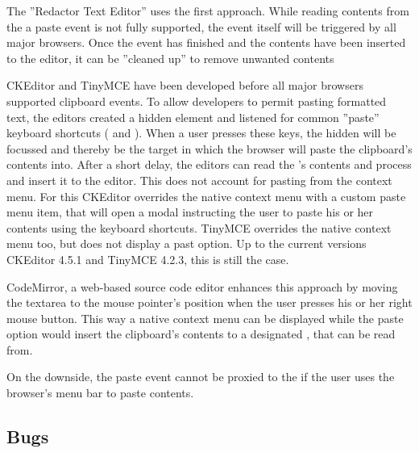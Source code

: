 The ''Redactor Text Editor'' uses the first approach. While reading contents from the a paste event is not fully supported, the event itself will be triggered by all major browsers. Once the event has finished and the contents have been inserted to the editor, it can be ''cleaned up'' to remove unwanted contents

CKEditor and TinyMCE have been developed before all major browsers supported clipboard events. To allow developers to permit pasting formatted text, the editors created a hidden  element and listened for common ''paste'' keyboard shortcuts ( and ). When a user presses these keys, the hidden  will be focussed and thereby be the target in which the browser will paste the clipboard's contents into. After a short delay, the editors can read the 's contents and process and insert it to the editor. This does not account for pasting from the context menu. For this CKEditor overrides the native context menu with a custom paste menu item, that will open a modal instructing the user to paste his or her contents using the keyboard shortcuts. TinyMCE overrides the native context menu too, but does not display a past option. Up to the current versions CKEditor 4.5.1 and TinyMCE 4.2.3, this is still the case.

CodeMirror, a web-based source code editor enhances this approach by moving the textarea to the mouse pointer's position when the user presses his or her right mouse button. This way a native context menu can be displayed while the paste option would insert the clipboard's contents to a designated , that can be read from.

On the downside, the paste event cannot be proxied to the  if the user uses the browser's menu bar to paste contents.


\subsection{Bugs}

